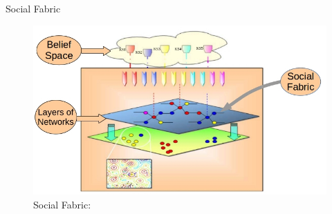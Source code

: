 \documentclass[table]{beamer}
\begin{document}
	\begin{frame}{Social Fabric}
		\begin{figure}[v]
			\includegraphics[scale=0.57]{socialfabric2}
			\centering
			\caption{Social Fabric: \cite{reynolds2010weaving}}
			\label{ref:socialfabric}
		\end{figure}		
	\end{frame}
	
	
\end{document}
